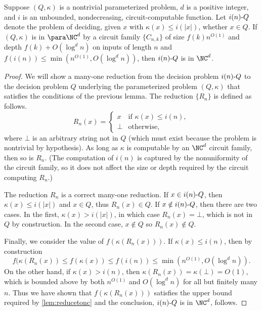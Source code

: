 \begin{corollary}\label{cor:reducetoself}
  Suppose $(Q, \kappa)$ is a nontrivial parameterized problem, $d$ is a positive integer, and $i$ is an unbounded, nondecreasing, circuit-computable function.
  Let $i(n) \textnormal{-} Q$ denote the problem of deciding, given $x$ with $\kappa(x) \leq i(|x|)$, whether $x \in Q$.
  If $(Q, \kappa)$ is in $\para \NC^d$ by a circuit family $\{C_{n, k}\}$ of size $f(k) n^{O(1)}$ and depth $f(k) + O(\log^d n)$ on inputs of length $n$ and $f(i(n)) \leq \min(n^{O(1)}, O(\log^d n))$, then $i(n) \textnormal{-} Q$ is in $\NC^d$.
\end{corollary}
\begin{proof}
  We will show a many-one reduction from the decision problem $i(n) \textnormal{-} Q$ to the decision problem $Q$ underlying the parameterized problem $(Q, \kappa)$ that satisfies the conditions of the previous lemma.
  The reduction $\{R_n\}$ is defined as follows.
  \[
  R_n(x) =
  \begin{cases}
    x & \text{if } \kappa(x) \leq i(n), \\
    \bot & \text{otherwise},
  \end{cases}
  \]
  where $\bot$ is an arbitrary string not in $Q$ (which must exist because the problem is nontrivial by hypothesis).
  As long as $\kappa$ is computable by an $\NC^d$ circuit family, then so is $R_n$.
  (The computation of $i(n)$ is captured by the nonuniformity of the circuit family, so it does not affect the size or depth required by the circuit computing $R_n$.)

  The reduction $R_n$ is a correct many-one reduction.
  If $x \in i(n) \textnormal{-} Q$, then $\kappa(x) \leq i(|x|)$ and $x \in Q$, thus $R_n(x) \in Q$.
  If $x \notin i(n) \textnormal{-} Q$, then there are two cases.
  In the first, $\kappa(x) > i(|x|)$, in which case $R_n(x) = \bot$, which is not in $Q$ by construction.
  In the second case, $x \notin Q$ so $R_n(x) \notin Q$.

  Finally, we consider the value of $f(\kappa(R_n(x)))$.
  If $\kappa(x) \leq i(n)$, then by construction
  \[
  f(\kappa(R_n(x)) \leq f(\kappa(x)) \leq f(i(n)) \leq \min(n^{O(1)}, O(\log^d n)).
  \]
  On the other hand, if $\kappa(x) > i(n)$, then $\kappa(R_n(x)) = \kappa(\bot) = O(1)$, which is bounded above by both $n^{O(1)}$ and $O(\log^d n)$ for all but finitely many $n$.
  Thus we have shown that $f(\kappa(R_n(x)))$ satisfies the upper bound required by \autoref{lem:reducetonc} and the conclusion, $i(n) \textnormal{-} Q$ is in $\NC^d$, follows.
\end{proof}

